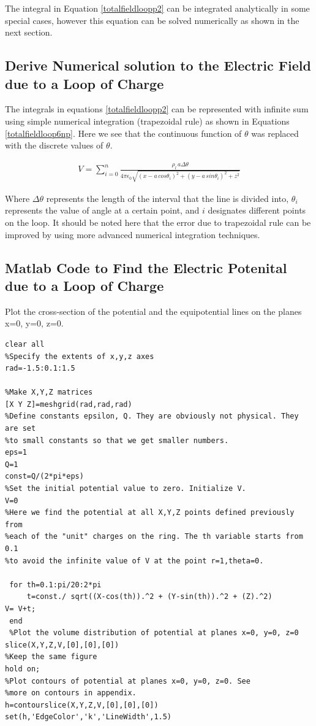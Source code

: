 \documentclass{ximera}
\begin{document}
The integral in Equation \ref{totalfieldloopp2} can be integrated analytically in some special cases, however this equation can be solved numerically as shown in the next section.






\subsection{Derive Numerical solution to the Electric Field due to a Loop of Charge}



The integrals in equations \ref{totalfieldloopp2} can be represented with infinite sum using  simple numerical integration (trapezoidal rule) as shown in Equations \ref{totalfieldloop6np}.  Here we see that the continuous function of $\theta$ was replaced with the discrete values of  $\theta$.




\begin{eqnarray}
V=  \sum_{i=0}^{n}\frac{\rho_l \, a   \Delta \theta }{4 \pi \epsilon_{0} {  \sqrt{(x - a \,cos{\theta_i})^2 +(y - a \,sin{\theta_i})^2 +z ^2}  }}  \label{totalfieldloop6np}
\end{eqnarray}

Where $\Delta\theta$ represents the length of the interval that the line is divided into, $\theta_i$ represents the value of angle at a certain point, and $i$ designates different points on the loop. It should be noted here that the error due to trapezoidal rule can be improved by using more advanced numerical integration techniques.


\subsection{Matlab Code to Find the Electric Potenital due to a Loop of Charge }
 

 Plot the cross-section of the potential and the equipotential lines on the planes x=0, y=0, z=0. 
  \begin{verbatim}
clear all
%Specify the extents of x,y,z axes
rad=-1.5:0.1:1.5
 
%Make X,Y,Z matrices 
[X Y Z]=meshgrid(rad,rad,rad)
%Define constants epsilon, Q. They are obviously not physical. They are set 
%to small constants so that we get smaller numbers.
eps=1
Q=1
const=Q/(2*pi*eps)
%Set the initial potential value to zero. Initialize V.
V=0
%Here we find the potential at all X,Y,Z points defined previously from
%each of the "unit" charges on the ring. The th variable starts from 0.1
%to avoid the infinite value of V at the point r=1,theta=0. 
 
 for th=0.1:pi/20:2*pi
     t=const./ sqrt((X-cos(th)).^2 + (Y-sin(th)).^2 + (Z).^2)
V= V+t;
 end
 %Plot the volume distribution of potential at planes x=0, y=0, z=0
slice(X,Y,Z,V,[0],[0],[0])
%Keep the same figure
hold on;
%Plot contours of potential at planes x=0, y=0, z=0. See 
%more on contours in appendix.
h=contourslice(X,Y,Z,V,[0],[0],[0])
set(h,'EdgeColor','k','LineWidth',1.5)
\end{verbatim}
\end{document}
